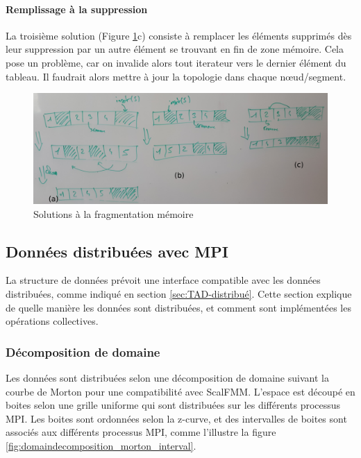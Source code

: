 \paragraph{Remplissage à la suppression}
La troisième solution (Figure \ref{fig:fragmentation_memoire}c) consiste à remplacer les éléments supprimés dès leur suppression par un autre élément se trouvant en fin de zone mémoire. Cela pose un problème, car on invalide alors tout iterateur vers le dernier élément du tableau. Il faudrait alors mettre à jour la topologie dans chaque nœud/segment.

\begin{figure}[H]
	\centering
		\includegraphics[width=\textwidth]{img/fragmentation_memoire}
		\caption{Solutions à la fragmentation mémoire}
		\label{fig:fragmentation_memoire}
\end{figure}


\subsection{Données distribuées avec MPI}

La structure de données prévoit une interface compatible avec les données distribuées, comme indiqué en section \ref{sec:TAD-distribué}. Cette section explique de quelle manière les données sont distribuées, et comment sont implémentées les opérations collectives.

\subsubsection{Décomposition de domaine}

Les données sont distribuées selon une décomposition de domaine suivant la courbe de Morton pour une compatibilité avec ScalFMM. L'espace est découpé en boites selon une grille uniforme qui sont distribuées sur les différents processus MPI. Les boites sont ordonnées selon la z-curve, et des intervalles de boites sont associés aux différents processus MPI, comme l'illustre la figure \ref{fig:domaindecomposition_morton_interval}.


